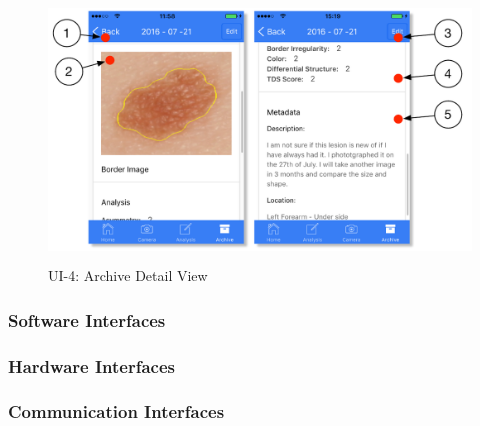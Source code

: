                 \begin{figure}[H]
                    \centering
                    \includegraphics[height=7cm]{assets/GUI/ARCHIVE_02.pdf}
                    \caption{UI-4: Archive Detail View}
                    \label{fig:ui-4}
                \end{figure}


        \subsubsection{Software Interfaces}
        \subsubsection{Hardware Interfaces}
        \subsubsection{Communication Interfaces}






